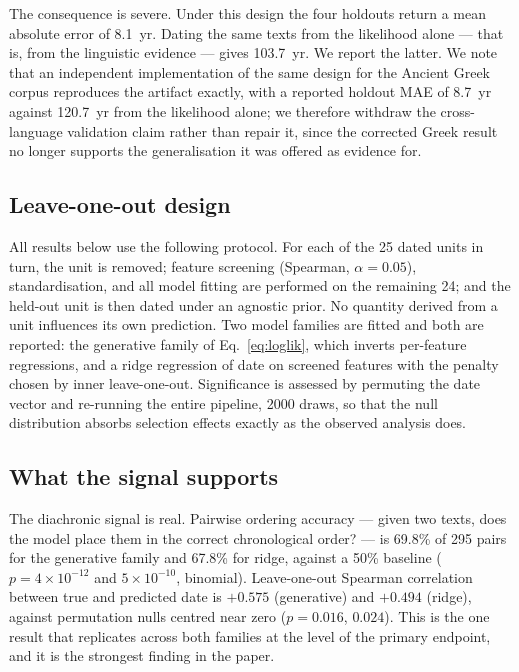 The consequence is severe.  Under this design the four holdouts return a
mean absolute error of 8.1~yr.  Dating the same texts from the likelihood
alone --- that is, from the linguistic evidence --- gives 103.7~yr.  We
report the latter.  We note that an independent implementation of the same
design for the Ancient Greek corpus reproduces the artifact exactly, with a
reported holdout MAE of 8.7~yr against 120.7~yr from the likelihood alone;
we therefore withdraw the cross-language validation claim rather than
repair it, since the corrected Greek result no longer supports the
generalisation it was offered as evidence for.

\subsection*{Leave-one-out design}

All results below use the following protocol.  For each of the 25 dated
units in turn, the unit is removed; feature screening (Spearman, $\alpha =
0.05$), standardisation, and all model fitting are performed on the
remaining 24; and the held-out unit is then dated under an agnostic prior.
No quantity derived from a unit influences its own prediction.  Two model
families are fitted and both are reported: the generative family of
Eq.~\ref{eq:loglik}, which inverts per-feature regressions, and a ridge
regression of date on screened features with the penalty chosen by inner
leave-one-out.  Significance is assessed by permuting the date vector and
re-running the entire pipeline, 2000 draws, so that the null distribution
absorbs selection effects exactly as the observed analysis does.

\subsection*{What the signal supports}

The diachronic signal is real.  Pairwise ordering accuracy --- given two
texts, does the model place them in the correct chronological order? --- is
69.8\% of 295 pairs for the generative family and 67.8\% for ridge, against
a 50\% baseline ($p = 4 \times 10^{-12}$ and $5 \times 10^{-10}$,
binomial).  Leave-one-out Spearman correlation between true and predicted
date is $+0.575$ (generative) and $+0.494$ (ridge), against permutation
nulls centred near zero ($p = 0.016$, $0.024$).  This is the one result
that replicates across both families at the level of the primary endpoint,
and it is the strongest finding in the paper.


